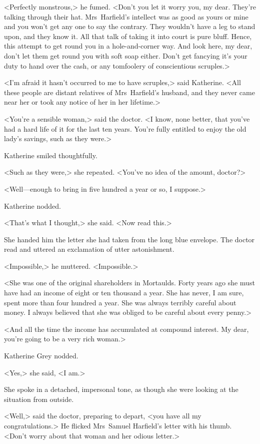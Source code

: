 <Perfectly monstrous,> he fumed. <Don't you let it worry you, my dear. They're talking through their hat. Mrs~Harfield's intellect was as good as yours or mine and you won't get any one to say the contrary. They wouldn't have a leg to stand upon, and they know it. All that talk of taking it into court is pure bluff. Hence, this attempt to get round you in a hole-and-corner way. And look here, my dear, don't let them get round you with soft soap either. Don't get fancying it's your duty to hand over the cash, or any tomfoolery of conscientious scruples.>

<I'm afraid it hasn't occurred to me to have scruples,> said Katherine. <All these people are distant relatives of Mrs~Harfield's husband, and they never came near her or took any notice of her in her lifetime.>

<You're a sensible woman,> said the doctor. <I know, none better, that you've had a hard life of it for the last ten years. You're fully entitled to enjoy the old lady's savings, such as they were.>

Katherine smiled thoughtfully.

<Such as they were,> she repeated. <You've no idea of the amount, doctor?>

<Well—enough to bring in five hundred a year or so, I suppose.>

Katherine nodded.

<That's what I thought,> she said. <Now read this.>

She handed him the letter she had taken from the long blue envelope. The doctor read and uttered an exclamation of utter astonishment.

<Impossible,> he muttered. <Impossible.>

<She was one of the original shareholders in Mortaulds. Forty years ago she must have had an income of eight or ten thousand a year. She has never, I am sure, spent more than four hundred a year. She was always terribly careful about money. I always believed that she was obliged to be careful about every penny.>

<And all the time the income has accumulated at compound interest. My dear, you're going to be a very rich woman.>

Katherine Grey nodded.

<Yes,> she said, <I am.>

She spoke in a detached, impersonal tone, as though she were looking at the situation from outside.

<Well,> said the doctor, preparing to depart, <you have all my congratulations.> He flicked Mrs~Samuel Harfield's letter with his thumb. <Don't worry about that woman and her odious letter.>


